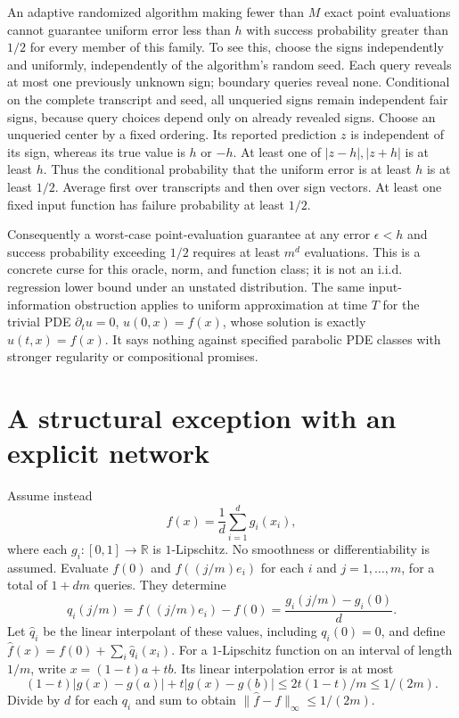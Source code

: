 \documentclass[11pt]{article}
\begin{document}
An adaptive randomized algorithm making fewer than $M$ exact
point evaluations cannot guarantee uniform error less than $h$
with success probability greater than $1/2$ for every member of
this family. To see this, choose the signs independently and
uniformly, independently of the algorithm's random seed.
Each query reveals at most one previously unknown sign; boundary
queries reveal none. Conditional on the complete transcript and
seed, all unqueried signs remain independent fair signs, because
query choices depend only on already revealed signs. Choose an
unqueried center by a fixed ordering. Its reported prediction $z$
is independent of its sign, whereas its true value is $h$ or
$-h$. At least one of $|z-h|,|z+h|$ is at least $h$. Thus the
conditional probability that the uniform error is at least $h$
is at least $1/2$. Average first over transcripts and then over
sign vectors. At least one fixed input function has failure
probability at least $1/2$.

Consequently a worst-case point-evaluation guarantee at any
error $\epsilon<h$ and success probability exceeding $1/2$
requires at least $m^d$ evaluations. This is a concrete curse
for this oracle, norm, and function class; it is not an i.i.d.
regression lower bound under an unstated distribution. The same
input-information obstruction applies to uniform approximation
at time $T$ for the trivial PDE $\partial_tu=0$, $u(0,x)=f(x)$,
whose solution is exactly $u(t,x)=f(x)$. It says nothing against
specified parabolic PDE classes with stronger regularity or
compositional promises.

\section{A structural exception with an explicit network}
Assume instead
\[
 f(x)=\frac1d\sum_{i=1}^d g_i(x_i),
\]
where each $g_i:[0,1]\to\mathbb R$ is $1$-Lipschitz. No
smoothness or differentiability is assumed. Evaluate $f(0)$ and
$f((j/m)e_i)$ for each $i$ and $j=1,\ldots,m$, for a total of
$1+dm$ queries. They determine
\[
 q_i(j/m)=f((j/m)e_i)-f(0)
 =\frac{g_i(j/m)-g_i(0)}d.
\]
Let $\widehat q_i$ be the linear interpolant of these values,
including $q_i(0)=0$, and define
$\widehat f(x)=f(0)+\sum_i\widehat q_i(x_i)$.
For a $1$-Lipschitz function on an interval of length $1/m$,
write $x=(1-t)a+tb$. Its linear interpolation error is at most
\[
 (1-t)|g(x)-g(a)|+t|g(x)-g(b)|
 \le 2t(1-t)/m\le1/(2m).
\]
Divide by $d$ for each $q_i$ and sum to obtain
$\|\widehat f-f\|_\infty\le1/(2m)$.
\end{document}
